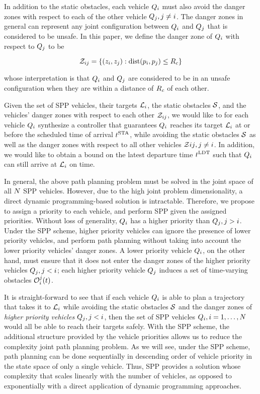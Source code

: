 In addition to the static obstacles, each vehicle $Q_{i}$ must also avoid the danger zones with respect to each of the other vehicle $Q_{j}, j\neq i$. The danger zones in general can represent any joint configuration between $Q_{i}$ and $Q_{j}$ that is considered to be unsafe. In this paper, we define the danger zone of $Q_{i}$ with respect to $Q_{j}$ to be

\begin{equation}
\mathcal{Z}_{ij} = \{(z_i, z_j): \text{dist}(p_i, p_j) \le R_c\}
\end{equation}

\noindent whose interpretation is that $Q_{i}$ and $Q_{j}$ are considered to be in an unsafe configuration when they are within a distance of $R_c$ of each other.

Given the set of SPP vehicles, their targets $\mathcal{L}_i$, the static obstacles $\mathcal{S}$, and the vehicles' danger zones with respect to each other $\mathcal{Z}_{ij}$, we would like to for each vehicle $Q_{i}$ synthesize a controller that guarantees $Q_{i}$ reaches its target $\mathcal{L}_i$ at or before the scheduled time of arrival $t^\text{STA}$, while avoiding the static obstacles $\mathcal{S}$ as well as the danger zones with respect to all other vehicles $\mathcal{Z}{ij}, j\neq i$. In addition, we would like to obtain a bound on the latest departure time $t^\text{LDT}$ such that $Q_{i}$ can still arrive at $\mathcal{L}_i$ on time.

In general, the above path planning problem must be solved in the joint space of all $N$ SPP vehicles. However, due to the high joint problem dimensionality, a direct dynamic programming-based solution is intractable. Therefore, we propose to assign a priority to each vehicle, and perform SPP given the assigned priorities. Without loss of generality, $Q_{i}$ has a higher priority than $Q_{j}, j>i$. Under the SPP scheme, higher priority vehicles can ignore the presence of lower priority vehicles, and perform path planning without taking into account the lower priority vehicles' danger zones. A lower priority vehicle $Q_{i}$, on the other hand, must ensure that it does not enter the danger zones of the higher priority vehicles $Q_{j}, j<i$; each higher priority vehicle $Q_{j}$ induces a set of time-varying obstacles $\mathcal{O}_i^j(t)$.

It is straight-forward to see that if each vehicle $Q_{i}$ is able to plan a trajectory that takes it to $\mathcal{L}_i$ while avoiding the static obstacles $\mathcal{S}$ and the danger zones of \textit{higher priority vehicles} $Q_{j}, j<i$, then the set of SPP vehicles $Q_{i}, i=1,\ldots,N$ would all be able to reach their targets safely. With the SPP scheme, the additional structure provided by the vehicle priorities allows us to reduce the complexity joint path planning problem. As we will see, under the SPP scheme, path planning can be done sequentially in descending order of vehicle priority in the state space of only a single vehicle. Thus, SPP provides a solution whose complexity that scales linearly with the number of vehicles, as opposed to exponentially with a direct application of dynamic programming approaches.

